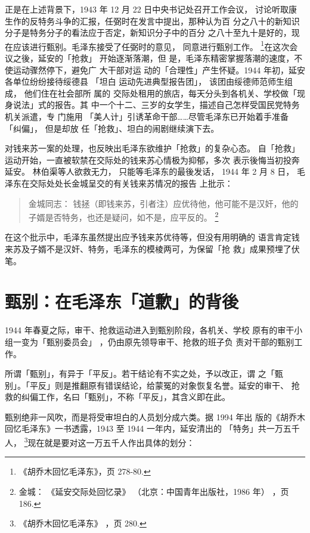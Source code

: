正是在上述背景下，1943 年 12 月 22 日中央书记处召开工作会议， 讨论听取康
生作的反特务斗争的汇报，任弼时在发言中提出，那种认为百 分之八十的新知识
分子是特务分子的看法应于否定，新知识分子中的百分 之八十至九十是好的，现
在应该进行甄别。毛泽东接受了任弼时的意见， 同意进行甄别工作。
\footnote{《胡乔木回忆毛泽东》，页 278-80.}在这次会议之後，延安的「抢救」
开始逐渐落潮，但 是，毛泽东精密掌握落潮的速度，不使运动骤然停下，避免广
大干部对运 动的「合理性」产生怀疑。1944 年初，延安各单位纷纷接待绥德县
「坦白 运动先进典型报告团」， 该团由绥德师范师生组成， 他们住在社会部所
属的 交际处租用的旅店，每天分头到各机关、学校做「现身说法」式的报告。其
中一个十二、三岁的女学生，描述自己怎样受国民党特务机关派遣，专 门施用
「美人计」引诱革命干部……尽管毛泽东已开始着手准备「纠偏」， 但是却放
任「抢救」、坦白的闹剧继续演下去。


对钱来苏一案的处理，也反映出毛泽东欲维护「抢救」的复杂心态。
自「抢救」运动开始，一直被软禁在交际处的钱来苏心情极为抑郁，多次
表示後悔当初投奔延安。
林伯渠等人欲救无力，
只能等毛泽东的最後发话，
1944 年 2 月 8 日，
毛泽东在交际处处长金城呈交的有关钱来苏情况的报告
上批示：
\begin{quote}
	\fzwkai 金城同志：
钱拯（即钱来苏，引者注）应优待他，他可能不是汉奸，他的
子婿是否特务，也还是疑问，如不是，应平反的。
\footnote{金城：
《延安交际处回忆录》
（北京：中国青年出版社，1986 年）
，页 186.}
\end{quote}

在这个批示中，毛泽东虽然提出应予钱来苏优待等，但没有用明确的
语言肯定钱来苏及子婿不是汉奸、特务，毛泽东的模棱两可，为保留「抢
救」成果预埋了伏笔。

\section{甄别：在毛泽东「道歉」的背後}

1944 年春夏之际，审干、抢救运动进入到甄别阶段，各机关、学校
原有的审干小组一变为「甄别委员会」
，仍由原先领导审干、抢救的班子负
责对干部的甄别工作。
 
 
所谓「甄别」，有异于「平反」。若干结论有不实之处，予以改正，谓 之「甄
别」。「平反」则是推翻原有错误结论，给蒙冤的对象恢复名誉。延安的审干、
抢救的纠偏工作，名曰「甄别」，不称「平反」，其含义即在此。

甄别绝非一风吹，而是将受审坦白的人员划分成六类。据 1994 年出
版的《胡乔木回忆毛泽东》一书透露，1943 至 1944 一年内，延安清出的
「特务」共一万五千人， \footnote{《胡乔木回忆毛泽东》
，页 280.}现在就是要对这一万五千人作出具体的划分：

